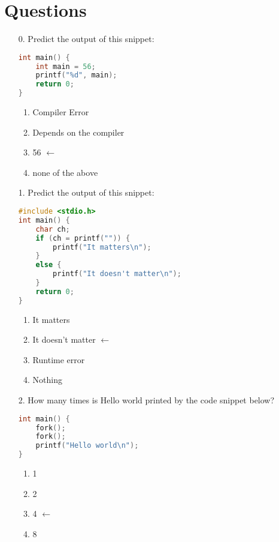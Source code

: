 \documentclass[letterpaper, 12pt]{article}
\begin{document}
\section*{Questions}

\begin{itemize}
	\item [0.] Predict the output of this snippet:

\begin{lstlisting}[language=C, style=c]
int main() {
	int main = 56;
	printf("%d", main);
	return 0;
}
\end{lstlisting}

	\begin{enumerate}[label=(\alph*)]
		\item Compiler Error
		\item Depends on the compiler
		\item 56	$\leftarrow$
		\item none of the above
	\end{enumerate}

	\item [1.] Predict the output of this snippet:

\begin{lstlisting}[language=C, style=c]
#include <stdio.h>
int main() {
	char ch;
	if (ch = printf("")) {
		printf("It matters\n");
	}
	else {
		printf("It doesn't matter\n");
	}
	return 0;
}
\end{lstlisting}

	\begin{enumerate}[label=(\alph*)]
		\item It matters
		\item It doesn't matter	$\leftarrow$
		\item Runtime error
		\item Nothing
	\end{enumerate}


	\item[2.] How many times is Hello world printed by the code snippet below?

\begin{lstlisting}[language=C, style=c]
int main() {
	fork();
	fork();
	printf("Hello world\n");
}
\end{lstlisting}

	\begin{enumerate}[label=(\alph*)]
		\item 1
		\item 2
		\item 4	$\leftarrow$
		\item 8
	\end{enumerate}


\end{itemize}
\end{document}
